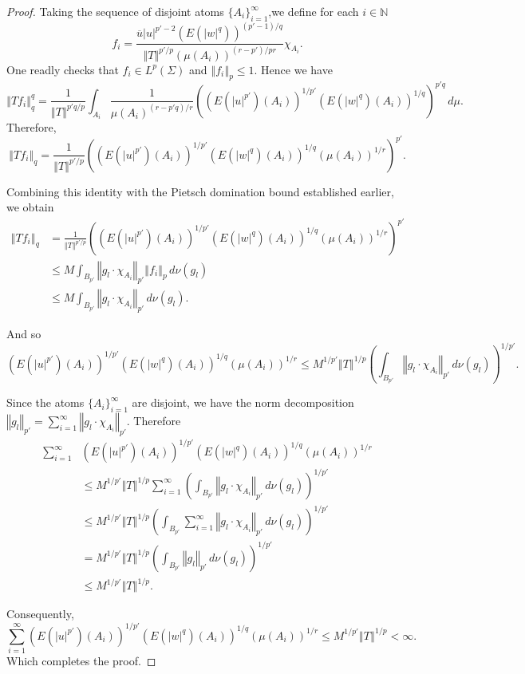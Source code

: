 \documentclass{amsart}
\theoremstyle{definition}\newtheorem{defn}[thm]{Definition}
\theoremstyle{remark}
\numberwithin{equation}{section}
\newcommand{\norm}[1]{\left\Vert#1\right\Vert}
\begin{document}
\begin{proof}
	Taking the sequence of disjoint atoms $\{A_i\}_{i=1}^{\infty}$,we define for each $i \in \mathbb N$ 
	\[
	f_i = \frac{\overline u |u|^{{p'}-2} (E(|w|^q))^{({p'}-1)/q}}{\norm{T}^{{p'}/p} (\mu(A_i))^{(r-{p'})/pr}} \chi_{A_i}.
	\]
	One readly checks that $f_i \in L^p(\Sigma)$ and $\norm{f_i}_p \leq 1$. Hence we have
	\[
	\norm{T f_i}_q^q = \frac{1}{\norm{T}^{p'q/p}} \int_{A_i} \frac{1}{\mu(A_i)^{{(r-p'q)}/r}} \left( (E(|u|^{p'})(A_i))^{1/{p'}} (E(|w|^q)(A_i))^{1/q} \right)^{p'q} \, d\mu.
	\]
	Therefore,
	\[
	\norm{T f_i}_q = \frac{1}{\norm{T}^{{p'}/p}} \left( (E(|u|^{p'})(A_i))^{1/{p'}} (E(|w|^q)(A_i))^{1/q} (\mu(A_i))^{1/r} \right)^{p'}.
	\]
	
	Combining this identity with the Pietsch domination bound established earlier, we obtain
	\begin{align*}
		\norm{T f_i}_q &= \frac{1}{\norm{T}^{{p'}/p}} \left( (E(|u|^{p'})(A_i))^{1/{p'}} (E(|w|^q)(A_i))^{1/q} (\mu(A_i))^{1/r} \right)^{p'} \\
		&\leq M \int_{B_{p'}} \norm{g_l\cdot\chi_{A_i}}_{p'} \norm{f_i}_p \, d\nu(g_l) \\
		&\leq M \int_{B_{p'}} \norm{g_l\cdot \chi_{A_i}}_{p'} \, d\nu(g_l).
	\end{align*}
	
	And so
	\[
	(E(|u|^{p'})(A_i))^{1/{p'}} (E(|w|^q)(A_i))^{1/q} (\mu(A_i))^{1/r} \leq M^{1/{p'}} \norm{T}^{1/p} \left( \int_{B_{p'}} \norm{g_l\cdot \chi_{A_i}}_{p'} \, d\nu(g_l) \right)^{1/{p'}}.
	\]
	
	Since the atoms $\{A_i\}_{i=1}^{\infty}$ are disjoint, we have the norm decomposition $\norm{g_l}_{p'} = \sum_{i=1}^{\infty} \norm{g_l\cdot \chi_{A_i}}_{p'} $. Therefore
	\begin{align*}
		\sum_{i=1}^{\infty} & (E(|u|^{p'})(A_i))^{1/{p'}} (E(|w|^q)(A_i))^{1/q} (\mu(A_i))^{1/r} \\
		&\leq M^{1/{p'}} \norm{T}^{1/p} \sum_{i=1}^{\infty} \left( \int_{B_{p'}} \norm{g_l\cdot \chi_{A_i}}_{p'} \, d\nu(g_l) \right)^{1/{p'}} \\
		&\leq M^{1/{p'}} \norm{T}^{1/p} \left( \int_{B_{p'}} \sum_{i=1}^{\infty} \norm{g_l\cdot \chi_{A_i}}_{p'} \, d\nu(g_l) \right)^{1/{p'}} \\
		&= M^{1/{p'}} \norm{T}^{1/p} \left( \int_{B_{p'}} \norm{g_l}_{p'} \, d\nu(g_l) \right)^{1/{p'}} \\
		&\leq M^{1/{p'}} \norm{T}^{1/p}.
	\end{align*}
	
	Consequently,
	\[
	\sum_{i=1}^{\infty} (E(|u|^{p'})(A_i))^{1/{p'}} (E(|w|^q)(A_i))^{1/q} (\mu(A_i))^{1/r} \leq M^{1/{p'}} \norm{T}^{1/p} < \infty.
	\]
	Which completes the proof.
\end{proof}
\end{document}
